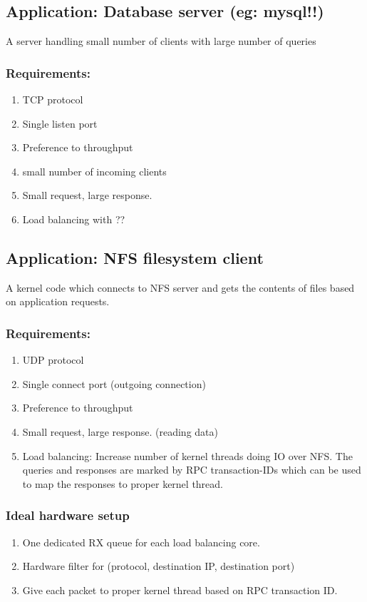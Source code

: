 \subsection{Application:  Database server (eg: mysql!!)}
A server handling small number of clients with large number of queries
\subsubsection{Requirements:}
\begin{enumerate}
    \item TCP protocol
    \item Single listen port
    \item Preference to throughput
    \item small number of incoming clients
    \item Small request, large response.
    \item Load balancing with ??
\end{enumerate}


\subsection{Application: NFS filesystem client}
A kernel code which connects to NFS server and gets the contents of files
based on application requests.
\subsubsection{Requirements:}
\begin{enumerate}
    \item UDP protocol
    \item Single connect port (outgoing connection)
    \item Preference to throughput
    \item Small request, large response. (reading data)
    \item Load balancing: Increase number of kernel threads doing IO over NFS.
        The queries and responses are marked by RPC transaction-IDs which
        can be used to map the responses to proper kernel thread.
\end{enumerate}



\subsubsection{Ideal hardware setup}
\begin{enumerate}
    \item One dedicated RX queue for each load balancing core.
    \item Hardware filter for (protocol, destination IP, destination port)
    \item Give each packet to proper kernel thread based on RPC
        transaction ID.
\end{enumerate}


